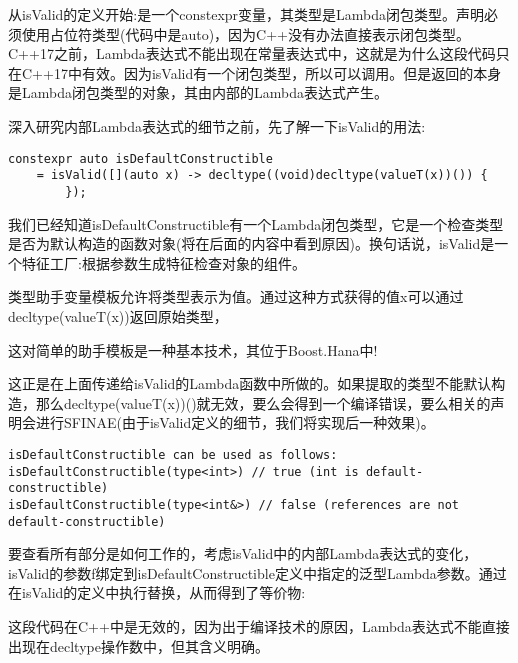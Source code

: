 从isValid的定义开始:是一个constexpr变量，其类型是Lambda闭包类型。声明必须使用占位符类型(代码中是auto)，因为C++没有办法直接表示闭包类型。C++17之前，Lambda表达式不能出现在常量表达式中，这就是为什么这段代码只在C++17中有效。因为isValid有一个闭包类型，所以可以调用。但是返回的本身是Lambda闭包类型的对象，其由内部的Lambda表达式产生。

深入研究内部Lambda表达式的细节之前，先了解一下isValid的用法:

\begin{lstlisting}[style=styleCXX]
constexpr auto isDefaultConstructible
	= isValid([](auto x) -> decltype((void)decltype(valueT(x))()) {
		});
\end{lstlisting}

我们已经知道isDefaultConstructible有一个Lambda闭包类型，它是一个检查类型是否为默认构造的函数对象(将在后面的内容中看到原因)。换句话说，isValid是一个特征工厂:根据参数生成特征检查对象的组件。

类型助手变量模板允许将类型表示为值。通过这种方式获得的值x可以通过decltype(valueT(x))返回原始类型，

\begin{tcolorbox}[colback=webgreen!5!white,colframe=webgreen!75!black]
\hspace*{0.75cm}这对简单的助手模板是一种基本技术，其位于Boost.Hana中!
\end{tcolorbox}

这正是在上面传递给isValid的Lambda函数中所做的。如果提取的类型不能默认构造，那么decltype(valueT(x))()就无效，要么会得到一个编译错误，要么相关的声明会进行SFINAE(由于isValid定义的细节，我们将实现后一种效果)。

\begin{lstlisting}[style=styleCXX]
isDefaultConstructible can be used as follows:
isDefaultConstructible(type<int>) // true (int is default-constructible)
isDefaultConstructible(type<int&>) // false (references are not default-constructible)
\end{lstlisting}

要查看所有部分是如何工作的，考虑isValid中的内部Lambda表达式的变化，isValid的参数f绑定到isDefaultConstructible定义中指定的泛型Lambda参数。通过在isValid的定义中执行替换，从而得到了等价物:

\begin{tcolorbox}[colback=webgreen!5!white,colframe=webgreen!75!black]
\hspace*{0.75cm}这段代码在C++中是无效的，因为出于编译技术的原因，Lambda表达式不能直接出现在decltype操作数中，但其含义明确。
\end{tcolorbox}

